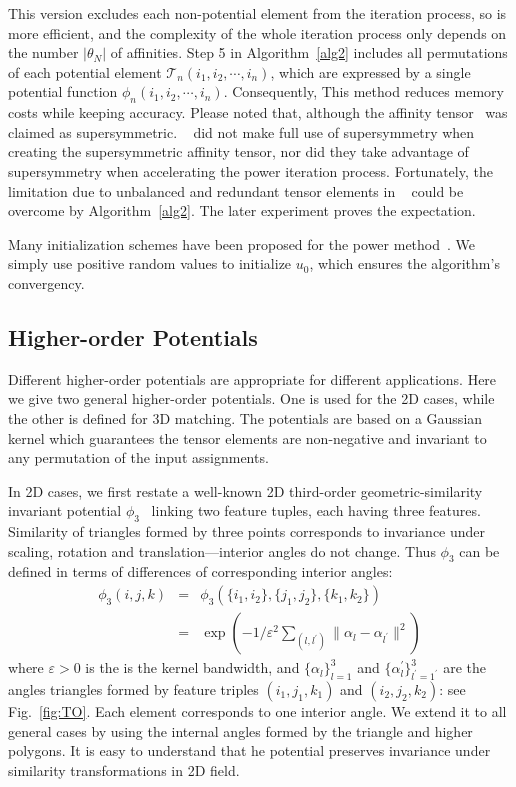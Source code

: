 This version excludes each non-potential element from the iteration process, so is more efficient, 
and the complexity of the whole iteration process only depends on the number $|\theta_N|$ of affinities. Step 5 in Algorithm~\ref{alg2} includes all permutations of each potential element $\mathcal{T}_n(i_1,i_2,\cdots,i_n)$,
which are expressed by a single potential function $\phi_n(i_1,i_2,\cdots,i_n)$.
Consequently, This method reduces memory costs while keeping accuracy.
Please noted that, although the affinity tensor~\cite{Duchenne_etal09} was claimed as supersymmetric.
~\cite{Duchenne_etal09} did not make full use of supersymmetry when creating the supersymmetric affinity tensor,
nor did they take advantage of supersymmetry when accelerating the power iteration process.
Fortunately, the limitation due to unbalanced and redundant tensor elements in ~\cite{Duchenne_etal09} could be overcome by Algorithm~\ref{alg2}.
The later experiment proves the expectation.

Many initialization schemes have been proposed for the power method~\cite{Kofidis02}. 
We simply use positive random values to initialize $u_0$, which ensures the algorithm's convergency.

\subsection{Higher-order Potentials}
\label{subsec:potentials}

Different higher-order potentials are appropriate for different applications.
Here we give two general higher-order potentials.
One is used for the 2D cases, while the other is defined for 3D matching.
The potentials are based on a Gaussian kernel which guarantees the tensor elements are non-negative and invariant to any permutation of the input assignments.

In 2D cases, we first restate a well-known 2D third-order geometric-similarity invariant potential $\phi_3$~\cite{Duchenne_etal09,Chertok10} linking two feature tuples, 
each having three features.
Similarity of triangles formed by three points corresponds to invariance under scaling, rotation and translation---interior angles do not change.
Thus $\phi_3$ can be defined in terms of differences of corresponding interior angles:
\begin{eqnarray}
\phi_3(i,j,k)&=&\phi_3(\{i_1,i_2\}, \{j_1,j_2\}, \{k_1,k_2\})\nonumber\\
&=&\exp(-1/\varepsilon^2\sum\nolimits_{(l,l^{'})}\lVert \alpha_l- \alpha_{l^{'} } \lVert^2 )
\end{eqnarray}
where $\varepsilon > 0$ is the is the kernel bandwidth, 
and $\{\alpha_l\}_{l=1}^3$  and $\{\alpha_l^{'}\}_{l^{'}=1^{'}}^{3}$ are the angles triangles formed by feature triples $(i_1,j_1,k_1)$ and $(i_2,j_2,k_2)$: 
see Fig.~\ref{fig:TO}. Each element corresponds to one interior angle.
We extend it to all general cases by using the internal angles formed by the triangle and higher polygons.
It is easy to understand that he potential preserves invariance under similarity transformations in 2D field.

